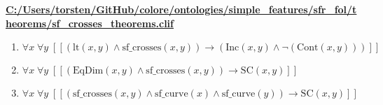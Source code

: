 \documentclass{article}
\begin{document}
\textbf{\url{C:/Users/torsten/GitHub/colore/ontologies/simple\_features/sfr\_fol/theorems/sf\_crosses\_theorems.clif}}

\begin{enumerate}
\item $\forall x\; \forall y\;  \left[ \left[ \left(\textrm{lt}(x,y) \land \textrm{sf\_crosses}(x,y)\right) \rightarrow \left(\textrm{Inc}(x,y) \land \neg \left(\textrm{Cont}(x,y)\right)\right) \right] \right]$
\item $\forall x\; \forall y\;  \left[ \left[ \left(\textrm{EqDim}(x,y) \land \textrm{sf\_crosses}(x,y)\right) \rightarrow \textrm{SC}(x,y) \right] \right]$
\item $\forall x\; \forall y\;  \left[ \left[ \left(\textrm{sf\_crosses}(x,y) \land \textrm{sf\_curve}(x) \land \textrm{sf\_curve}(y)\right) \rightarrow \textrm{SC}(x,y) \right] \right]$
\end{enumerate}
\end{document}
